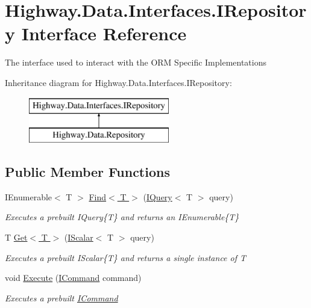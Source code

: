 \hypertarget{interface_highway_1_1_data_1_1_interfaces_1_1_i_repository}{\section{Highway.\-Data.\-Interfaces.\-I\-Repository Interface Reference}
\label{interface_highway_1_1_data_1_1_interfaces_1_1_i_repository}
}


The interface used to interact with the O\-R\-M Specific Implementations  


Inheritance diagram for Highway.\-Data.\-Interfaces.\-I\-Repository\-:\begin{figure}[H]
\begin{center}
\leavevmode
\includegraphics[height=2.000000cm]{interface_highway_1_1_data_1_1_interfaces_1_1_i_repository}
\end{center}
\end{figure}
\subsection*{Public Member Functions}
\begin{DoxyCompactItemize}
\item 
I\-Enumerable$<$ T $>$ \hyperlink{interface_highway_1_1_data_1_1_interfaces_1_1_i_repository_a18bd55ae31839881dc43cb0ba958086b}{Find$<$ T $>$} (\hyperlink{interface_highway_1_1_data_1_1_interfaces_1_1_i_query-g}{I\-Query}$<$ T $>$ query)
\begin{DoxyCompactList}\small\item\em Executes a prebuilt I\-Query\{\-T\} and returns an I\-Enumerable\{\-T\} \end{DoxyCompactList}\item 
T \hyperlink{interface_highway_1_1_data_1_1_interfaces_1_1_i_repository_ab64290450d370e1c29e31ea92d3ff18d}{Get$<$ T $>$} (\hyperlink{interface_highway_1_1_data_1_1_interfaces_1_1_i_scalar-g}{I\-Scalar}$<$ T $>$ query)
\begin{DoxyCompactList}\small\item\em Executes a prebuilt I\-Scalar\{\-T\} and returns a single instance of {\itshape T}  \end{DoxyCompactList}\item 
void \hyperlink{interface_highway_1_1_data_1_1_interfaces_1_1_i_repository_a91324642f3ca885ac8b4b5deb7bd3e8f}{Execute} (\hyperlink{interface_highway_1_1_data_1_1_interfaces_1_1_i_command}{I\-Command} command)
\begin{DoxyCompactList}\small\item\em Executes a prebuilt \hyperlink{interface_highway_1_1_data_1_1_interfaces_1_1_i_command}{I\-Command} \end{DoxyCompactList}\end{DoxyCompactItemize}
